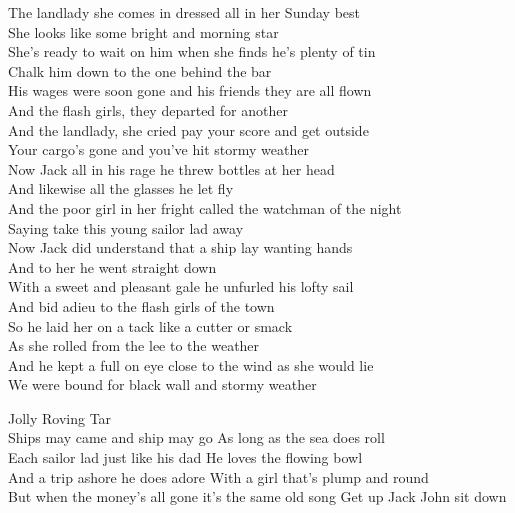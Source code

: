 \documentclass[letterpaper,9pt]{article}
\begin{document}
The landlady she comes in dressed all in her Sunday best \\
She looks like some bright and morning star \\
She’s ready to wait on him when she finds he’s plenty of tin \\
Chalk him down to the one behind the bar \\

His wages were soon gone and his friends they are all flown \\
And the flash girls, they departed for another \\
And the landlady, she cried pay your score and get outside \\
Your cargo’s gone and you’ve hit stormy weather \\

Now Jack all in his rage he threw bottles at her head \\
And likewise all the glasses he let fly \\
And the poor girl in her fright called the watchman of the night \\
Saying take this young sailor lad away \\

Now Jack did understand that a ship lay wanting hands \\
And to her he went straight down \\
With a sweet and pleasant gale he unfurled his lofty sail \\
And bid adieu to the flash girls of the town \\

So he laid her on a tack like a cutter or smack \\
As she rolled from the lee to the weather \\
And he kept a full on eye close to the wind as she would lie \\
We were bound for black wall and stormy weather \\

\newpage
{}
\Huge
Jolly Roving Tar\\

\Large
Ships may came and ship may go As long as the sea does roll \\
Each sailor lad just like his dad He loves the flowing bowl \\
And a trip ashore he does adore With a girl that's plump and round  \\
But when the money's all gone it's the same old song Get up Jack John sit down \\
\end{document}
